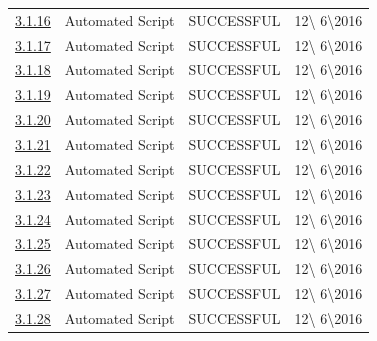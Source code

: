 \documentclass{article}
\begin{document}
\begin{table}[H]
\begin{tabularx}{\textwidth}{| c | l | X | l |}
	\hyperref[sec:3.1.16]{3.1.16}& Automated Script  & SUCCESSFUL & 12\textbackslash
	6\textbackslash2016\\
	\hyperref[sec:3.1.17]{3.1.17}& Automated Script  & SUCCESSFUL & 12\textbackslash
	6\textbackslash2016\\
	\hyperref[sec:3.1.18]{3.1.18}& Automated Script  & SUCCESSFUL & 12\textbackslash
	6\textbackslash2016\\
	\hyperref[sec:3.1.19]{3.1.19}& Automated Script  & SUCCESSFUL & 12\textbackslash
	6\textbackslash2016\\
	\hyperref[sec:3.1.20]{3.1.20}& Automated Script  & SUCCESSFUL & 12\textbackslash
	6\textbackslash2016\\
	\hyperref[sec:3.1.21]{3.1.21}& Automated Script  & SUCCESSFUL & 12\textbackslash
	6\textbackslash2016\\
	\hyperref[sec:3.1.22]{3.1.22}& Automated Script  & SUCCESSFUL & 12\textbackslash
	6\textbackslash2016\\
	\hyperref[sec:3.1.23]{3.1.23}& Automated Script  & SUCCESSFUL & 12\textbackslash
	6\textbackslash2016\\
	\hyperref[sec:3.1.24]{3.1.24}& Automated Script  & SUCCESSFUL & 12\textbackslash
	6\textbackslash2016\\
	\hyperref[sec:3.1.25]{3.1.25}& Automated Script  & SUCCESSFUL & 12\textbackslash
	6\textbackslash2016\\
	\hyperref[sec:3.1.26]{3.1.26}& Automated Script  & SUCCESSFUL & 12\textbackslash
	6\textbackslash2016\\
	\hyperref[sec:3.1.27]{3.1.27}& Automated Script  & SUCCESSFUL & 12\textbackslash
	6\textbackslash2016\\
	\hyperref[sec:3.1.28]{3.1.28}& Automated Script  & SUCCESSFUL & 12\textbackslash
	6\textbackslash2016\\
		\bottomrule
	\end{tabularx}
\end{table}
\end{document}
